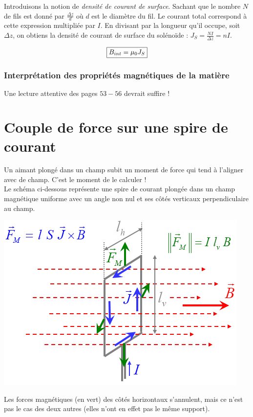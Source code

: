 \documentclass	[11pt, a4paper, openany]{book}
\begin{document}
Introduisons la notion de \textit{densité de courant de surface}. Sachant que le nombre $N$ de fils est donné par $\frac{\Delta z}{d}$ où $d$ est le diamètre du fil. Le courant total correspond à cette expression multipliée par $I$. En divisant par la longueur qu'il occupe, soit $\Delta z$, on obtiens la densité de courant de surface du solénoïde : $J_S = \frac{NI}{\Delta z} = nI$.

\begin{equation}
\fbox{$B_{int} = \mu_0J_S$}
\end{equation}

\subsubsection{Interprétation des propriétés magnétiques de la matière}
Une lecture attentive des pages $53 - 56$ devrait suffire !

\section{Couple de force sur une spire de courant}
Un aimant plongé dans un champ subit un moment de force qui tend à l'aligner avec de champ. C'est le moment de le calculer ! \\
Le schéma ci-dessous représente une spire de courant plongée dans un champ magnétique uniforme avec un angle non nul et ses côtés verticaux perpendiculaire au champ.
\begin{center}
\includegraphics[scale=0.50]{magneto/image13.png}
\end{center}

Les forces magnétiques (en vert) des côtés horizontaux s'annulent, mais ce n'est pas le cas des deux autres (elles n'ont en effet pas le même support).\\
\end{document}
